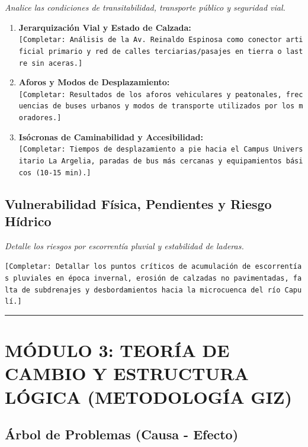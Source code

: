 \documentclass[
  letterpaper,
  DIV=11,
  numbers=noendperiod]{scrreprt}
\providecommand{\tightlist}{%
  \setlength{\itemsep}{0pt}\setlength{\parskip}{0pt}}
\begin{document}
\emph{Analice las condiciones de transitabilidad, transporte público y
seguridad vial.}

\begin{enumerate}
\def\labelenumi{\arabic{enumi}.}
\tightlist
\item
  \textbf{Jerarquización Vial y Estado de Calzada:}\\
  \texttt{{[}Completar:\ Análisis\ de\ la\ Av.\ Reinaldo\ Espinosa\ como\ conector\ artificial\ primario\ y\ red\ de\ calles\ terciarias/pasajes\ en\ tierra\ o\ lastre\ sin\ aceras.{]}}
\item
  \textbf{Aforos y Modos de Desplazamiento:}\\
  \texttt{{[}Completar:\ Resultados\ de\ los\ aforos\ vehiculares\ y\ peatonales,\ frecuencias\ de\ buses\ urbanos\ y\ modos\ de\ transporte\ utilizados\ por\ los\ moradores.{]}}
\item
  \textbf{Isócronas de Caminabilidad y Accesibilidad:}\\
  \texttt{{[}Completar:\ Tiempos\ de\ desplazamiento\ a\ pie\ hacia\ el\ Campus\ Universitario\ La\ Argelia,\ paradas\ de\ bus\ más\ cercanas\ y\ equipamientos\ básicos\ (10-15\ min).{]}}
\end{enumerate}

\section{Vulnerabilidad Física, Pendientes y Riesgo
Hídrico}\label{vulnerabilidad-fuxedsica-pendientes-y-riesgo-huxeddrico}

\emph{Detalle los riesgos por escorrentía pluvial y estabilidad de
laderas.}

\texttt{{[}Completar:\ Detallar\ los\ puntos\ críticos\ de\ acumulación\ de\ escorrentías\ pluviales\ en\ época\ invernal,\ erosión\ de\ calzadas\ no\ pavimentadas,\ falta\ de\ subdrenajes\ y\ desbordamientos\ hacia\ la\ microcuenca\ del\ río\ Capulí.{]}}

\begin{center}\rule{0.5\linewidth}{0.5pt}\end{center}

\chapter{MÓDULO 3: TEORÍA DE CAMBIO Y ESTRUCTURA LÓGICA (METODOLOGÍA
GIZ)}\label{muxf3dulo-3-teoruxeda-de-cambio-y-estructura-luxf3gica-metodologuxeda-giz}

\section{Árbol de Problemas (Causa -
Efecto)}\label{uxe1rbol-de-problemas-causa---efecto}
\end{document}
